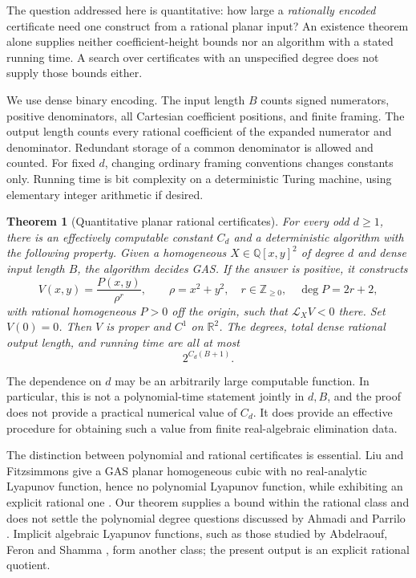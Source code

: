 \documentclass[11pt]{article}
\newtheorem{theorem}{Theorem}
\theoremstyle{remark}\newtheorem{remark}[theorem]{Remark}
\newcommand{\Q}{\mathbb Q}
\newcommand{\R}{\mathbb R}
\newcommand{\LX}{\mathcal L_X}
\begin{document}
The question addressed here is quantitative: how large a \emph{rationally encoded} certificate need one construct from a rational planar input? An existence theorem alone supplies neither coefficient-height bounds nor an algorithm with a stated running time. A search over certificates with an unspecified degree does not supply those bounds either.

We use dense binary encoding. The input length \(B\) counts signed numerators, positive denominators, all Cartesian coefficient positions, and finite framing. The output length counts every rational coefficient of the expanded numerator and denominator. Redundant storage of a common denominator is allowed and counted. For fixed \(d\), changing ordinary framing conventions changes constants only. Running time is bit complexity on a deterministic Turing machine, using elementary integer arithmetic if desired.

\begin{theorem}[Quantitative planar rational certificates]\label{thm:main}
For every odd \(d\geq1\), there is an effectively computable constant \(C_d\) and a deterministic algorithm with the following property. Given a homogeneous \(X\in\Q[x,y]^2\) of degree \(d\) and dense input length \(B\), the algorithm decides GAS. If the answer is positive, it constructs
\begin{equation}\label{eq:certificate}
 V(x,y)=\frac{P(x,y)}{\rho^r},\qquad
 \rho=x^2+y^2,\quad r\in\mathbb Z_{\geq0},
 \quad \deg P=2r+2,
\end{equation}
with rational homogeneous \(P>0\) off the origin, such that \(\LX V<0\) there. Set \(V(0)=0\). Then \(V\) is proper and \(C^1\) on \(\R^2\).
The degrees, total dense rational output length, and running time are all at most
\[
                   2^{C_d(B+1)}.
\]
\end{theorem}

The dependence on \(d\) may be an arbitrarily large computable function. In particular, this is not a polynomial-time statement jointly in \(d,B\), and the proof does not provide a practical numerical value of \(C_d\). It does provide an effective procedure for obtaining such a value from finite real-algebraic elimination data.

The distinction between polynomial and rational certificates is essential. Liu and Fitzsimmons give a GAS planar homogeneous cubic with no real-analytic Lyapunov function, hence no polynomial Lyapunov function, while exhibiting an explicit rational one \cite{LF}. Our theorem supplies a bound within the rational class and does not settle the polynomial degree questions discussed by Ahmadi and Parrilo \cite[Section 6]{AP}. Implicit algebraic Lyapunov functions, such as those studied by Abdelraouf, Feron and Shamma \cite{AFS}, form another class; the present output is an explicit rational quotient.
\end{document}
